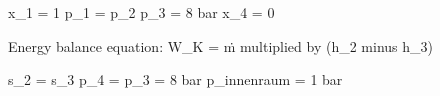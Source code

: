 x_1 = 1  
p_1 = p_2  
p_3 = 8 bar  
x_4 = 0  

Energy balance equation:  
W_K = ṁ multiplied by (h_2 minus h_3)  

s_2 = s_3  
p_4 = p_3 = 8 bar  
p_innenraum = 1 bar